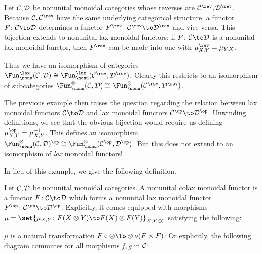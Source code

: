 \enote

\bexam

    Let ${{\cal C}},{{\cal D}}$ be nonunital monoidal categories whose reverses are $\C^\rev,\D^\rev$.
    Because $\C,\C^\rev$ have the same underlying categorical structure, a functor $F\colon\C\to\D$ determines a functor $F^\rev\colon\C^\rev\to\D^\rev$ and vice versa.
    This bijection extends to nonunital lax monoidal functors: if $F\colon\C\to\D$ is a nonunital lax monoidal functor, then $F^\rev$ can be made into one with $\mu^\rev_{X,Y}=\mu_{Y,X}$.

    Thus we have an isomorphism of categories $\Fun^\lax_\nonu(\C,\D)\cong\Fun^\lax_\nonu(\C^\rev,\D^\rev)$.
    Clearly this restricts to an isomorphism of subcategories $\Fun^\otimes_\nonu(\C,\D)\cong\Fun^\otimes_\nonu(\C^\rev,\D^\rev)$.

\eexam

\bexam

    The previous example then raises the question regarding the relation between lax monoidal functors $\C\to\D$ and lax monoidal functors $\C^\op\to\D^\op$.
    Unwinding definitions, we see that the obvious bijection would require us defining $\mu^\op_{X,Y}=\mu_{X,Y}^{-1}$.
    This defines an isomorphism $\Fun^\otimes_\nonu(\C,\D)^\op\cong\Fun^\otimes_\nonu(\C^\op,\D^\op)$.
    But this does not extend to an isomorphism of {\it lax\/} monoidal functors!

\eexam

In lieu of this example, we give the following definition.

\bdefn[title={Nonunital colax monoidal functors}]

    Let ${{\cal C}},{{\cal D}}$ be nonunital monoidal categories.
    A {\emphcolor nonunital colax monoidal functor} is a functor $F\colon\C\to\D$ which forms a nonunital lax monoidal functor $F^\op\colon\C^\op\to\D^\op$.
    Explicitly, it comes equipped with morphisms $\mu=\set{\mu_{X,Y}\colon F(X\otimes Y)\to F(X)\otimes F(Y)}_{X,Y\in\C}$ satisfying the following:

    \benum
        \item $\mu$ is a natural transformation $F\circ\otimes\To\otimes\circ(F\times F)$:
        Or explicitly, the following diagram commutes for all morphisms $f,g$ in ${{\cal C}}$:

